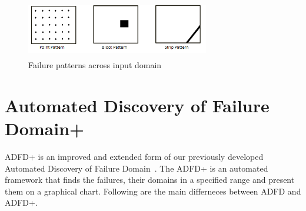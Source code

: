 \begin{figure}[ht]                                    
\centering
\includegraphics[width= 8cm,height=2.5cm]{chapter6/ART_Patterns.png}
\caption{Failure patterns across input domain~\cite{chan1996proportional}}
\label{fig:failurePatterns}
\end{figure}



 


\section{Automated Discovery of Failure Domain+}\label{sec:adfd+}
ADFD+ is an improved and extended form of our previously developed Automated Discovery of Failure Domain~\cite{ahmad2013adfd}. The ADFD+ is an automated framework that finds the failures, their domains in a specified range and present them on a graphical chart. Following  are the main differneces between ADFD and ADFD+.

